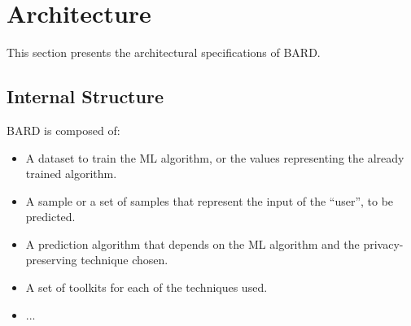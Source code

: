 
\section{Architecture}
\label{sec:Arquitecture}



This section presents the architectural specifications of \ac{BARD}.


\subsection{Internal Structure}
\label{subsec:InternalStructure}


\ac{BARD} is composed of:

\begin{itemize}
	\setlength\itemsep{1em}
	\item A dataset to train the \ac{ML} algorithm, or the values representing the already trained algorithm.
	\item A sample or a set of samples that represent the input of the ``user'', to be predicted.
	\item A prediction algorithm that depends on the \ac{ML} algorithm and the privacy-preserving technique chosen.
	\item A set of toolkits for each of the techniques used.
	\item ...
\end{itemize}




